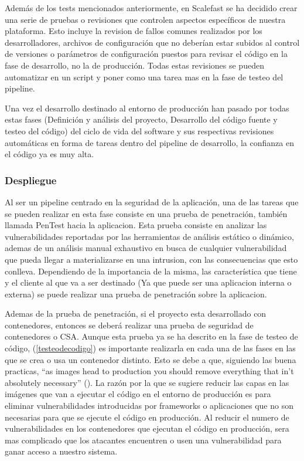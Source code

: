 \documentclass[12pt]{report} %
\begin{document}
Además de los tests mencionados anteriormente, en Scalefast se ha decidido crear
una serie de pruebas o revisiones que controlen aspectos específicos de nuestra
plataforma.
Esto incluye la revision de fallos comunes realizados por los desarrolladores,
archivos de configuración que no deberían estar subidos al control de versiones
o parámetros de configuración puestos para revisar el código en la fase de
desarrollo, no la de producción.
Todas estas revisiones se pueden automatizar en un script y poner como una tarea
mas en la fase de testeo del \gls{pipeline}. 

Una vez el desarrollo destinado al entorno de producción han pasado por
todas estas fases (Definición y análisis del proyecto, Desarrollo del código
fuente y testeo del código) del ciclo de vida del software y sus respectivas
revisiones automáticas en forma de tareas dentro del \gls{pipeline} de
desarrollo, la confianza en el código ya es muy alta.

\subsubsection{Despliegue} 

Al ser un \gls{pipeline} centrado en la seguridad de la aplicación, una de las tareas
que se pueden realizar en esta fase consiste en una prueba de penetración,
también llamada \gls{PenTest} hacia la aplicacion.
Esta prueba consiste en analizar las vulnerabilidades reportadas por las
herramientas de análisis estático o dinámico, ademas de un análisis manual
exhaustivo en busca de cualquier vulnerabilidad que pueda llegar a
materializarse en una intrusion, con las consecuencias que esto conlleva.  
Dependiendo de la importancia de la misma, las característica que tiene y el
cliente al que va a ser destinado (Ya que puede ser una aplicacion interna o
externa) se puede realizar una prueba de penetración sobre la aplicacion.

Ademas de la prueba de penetración, si el proyecto esta desarrollado con
contenedores, entonces se deberá realizar una prueba de seguridad de
contenedores o \gls{CSA}.
Aunque esta prueba ya se ha descrito en la fase de testeo de código,
(\ref{testeodecodigo}) es importante realizarla en cada una de las fases en las
que se crea o usa un contenedor distinto.
Esto se debe a que, siguiendo las buena practicas, ``as images head
to production you should remove everything that in’t absolutely necessary''
(\cite{Armstrong2020}).
La razón por la que se sugiere reducir las capas en las imágenes que van a
ejecutar el código en el entorno de producción es para eliminar vulnerabilidades
introducidas por frameworks o aplicaciones que no son necesarias para que se
ejecute el código en producción.
Al reducir el numero de vulnerabilidades en los contenedores que ejecutan el
código en producción, sera mas complicado que los atacantes encuentren o usen
una vulnerabilidad para ganar acceso a nuestro sistema.
\end{document}
